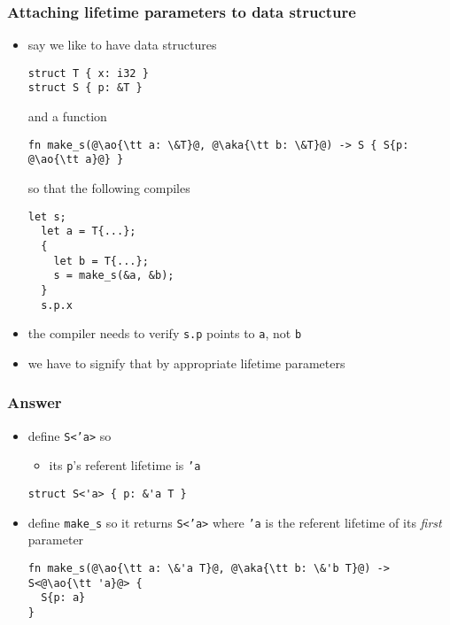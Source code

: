 \documentclass[12pt,dvipdfmx]{beamer}
\newcommand{\ao}[1]{{\color{blue}#1}}
\newcommand{\aka}[1]{{\color{red}#1}}
\begin{document}
\begin{frame}[fragile]
  \frametitle{Attaching lifetime parameters to data structure}
  \begin{itemize}
  \item say we like to have data structures
\begin{lstlisting}[basicstyle=\ttfamily\tiny]
struct T { x: i32 }
struct S { p: &T }
\end{lstlisting}
and a function 
\begin{lstlisting}[basicstyle=\ttfamily\tiny]
fn make_s(@\ao{\tt a: \&T}@, @\aka{\tt b: \&T}@) -> S { S{p: @\ao{\tt a}@} }
\end{lstlisting}
so that the following compiles
\begin{lstlisting}[basicstyle=\ttfamily\tiny]
  let s;
  let a = T{...};
  {
    let b = T{...};
    s = make_s(&a, &b);
  }
  s.p.x
\end{lstlisting}
\item the compiler needs to verify {\tt s.p} points to {\tt a}, not {\tt b}
\item we have to signify that by appropriate lifetime parameters
\end{itemize}
\end{frame}

\begin{frame}[fragile]
  \frametitle{Answer}
  \begin{itemize}
  \item define {\tt S<'a>} so
    \begin{itemize}
    \item its {\tt p}'s referent lifetime is {\tt 'a}
    \end{itemize}
\begin{lstlisting}
struct S<'a> { p: &'a T }
\end{lstlisting}
\item define {\tt make\_s} so it returns {\tt S<'a>} 
  where {\tt 'a} is the referent lifetime of its {\it first} parameter
\begin{lstlisting}
fn make_s(@\ao{\tt a: \&'a T}@, @\aka{\tt b: \&'b T}@) -> S<@\ao{\tt 'a}@> {
  S{p: a}
}    
\end{lstlisting}
\end{itemize}
\end{frame}
\end{document}
